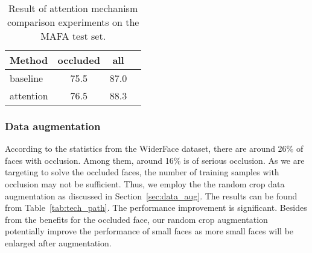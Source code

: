 \documentclass[10pt,twocolumn,letterpaper]{article}
\begin{document}
\begin{table}[htbp]
\begin{center}
\begin{tabular}{|l|c|c|c|}
\hline
Method & occluded & all \\
\hline
baseline & 75.5 & 87.0 \\
attention & 76.5 & 88.3 \\
\hline
\end{tabular}
\end{center}
\caption{Result of attention mechanism comparison experiments on the MAFA test set.}
\label{table: attention_mafa}
\end{table}









\begin{table*}[htbp]
\begin{center}
\end{center}
\caption{The ablation study of FAN on the WiderFace validation set.}
\label{tab:tech_path}
\end{table*}

\subsubsection{Data augmentation} 

According to the statistics from the WiderFace dataset, there are around 26\% of faces with occlusion. Among them, around 16\% is of serious occlusion. As we are targeting to solve the occluded faces, the number of training samples with occlusion may not be sufficient. Thus, we employ the the random crop data augmentation as discussed in Section~\ref{sec:data_aug}. The results can be found from Table~\ref{tab:tech_path}. The performance improvement is significant. Besides from the benefits for the occluded face, our random crop augmentation potentially improve the performance of small faces as more small faces will be enlarged after augmentation.
\end{document}
